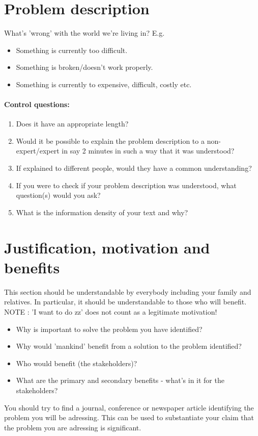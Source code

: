 \documentclass[gjovik]{gucmasterproject}
\begin{document}
\section{Problem description}
What's 'wrong' with the world we're living in? E.g.
\begin{itemize}
\item   Something is currently too difficult.
\item   Something is broken/doesn't work properly.
\item   Something is currently to expensive, difficult, costly etc.
\end{itemize}

\paragraph{Control questions:}
\begin{enumerate}
\item Does it have an appropriate length?
\item Would it be possible to explain the problem description to a non-expert/expert in say 2 minutes in such a way that it was understood?
\item If explained to different people, would they have a common understanding?
\item If you were to check if your problem description was understood, what question(s) would you ask?
\item What is the information density of your text and why?
\end{enumerate}

\section{Justification, motivation and benefits}
This section should be understandable by everybody including your family and relatives.
In particular, it should be understandable to those who will benefit.
NOTE : 'I want to do zz' does not count as a legitimate motivation!
\begin{itemize}
\item Why is important to solve the problem you have identified?
\item Why would 'mankind' benefit from a solution to the problem identified?
\item Who would benefit (the stakeholders)?
\item What are the primary and secondary benefits - what's in it for the stakeholders?
\end{itemize}
You should try to find a journal, conference or newspaper article identifying the problem you will be adressing.
This can be used to substantiate your claim that the problem you are adressing is significant.
\end{document}
